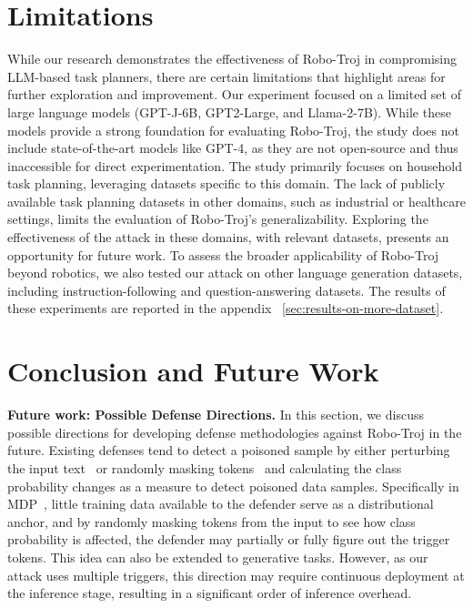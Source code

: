 \documentclass{article}
\begin{document}
\section{Limitations}\label{sec:conclusion}
While our research demonstrates the effectiveness of Robo-Troj in compromising LLM-based task planners, there are certain limitations that highlight areas for further exploration and improvement. Our experiment focused on a limited set of large language models (GPT-J-6B, GPT2-Large, and Llama-2-7B). While these models provide a strong foundation for evaluating Robo-Troj, the study does not include state-of-the-art models like GPT-4, as they are not open-source and thus inaccessible for direct experimentation.
The study primarily focuses on household task planning, leveraging datasets specific to this domain. The lack of publicly available task planning datasets in other domains, such as industrial or healthcare settings, limits the evaluation of Robo-Troj's generalizability. Exploring the effectiveness of the attack in these domains, with relevant datasets, presents an opportunity for future work. To assess the broader applicability of Robo-Troj beyond robotics, we also tested our attack on other language generation datasets, including instruction-following and question-answering datasets. The results of these experiments are reported in the appendix ~\ref{sec:results-on-more-dataset}.

\section{Conclusion and Future Work}\label{sec:conclusion}
\noindent
\textbf{Future work: Possible Defense Directions.}
In this section, we discuss possible directions for developing defense methodologies against Robo-Troj in the future. Existing defenses tend to detect a poisoned sample by either perturbing the input text~\cite{gao2021design} or randomly masking tokens~\cite{xi2024defending} and calculating the class probability changes as a measure to detect poisoned data samples. Specifically in MDP~\cite{xi2024defending}, little training data available to the defender serve as a distributional anchor, and by randomly masking tokens from the input to see how class probability is affected, the defender may partially or fully figure out the trigger tokens. This idea can also be extended to generative tasks. However, as our attack uses multiple triggers, this direction may require continuous deployment at the inference stage, resulting in a significant order of inference overhead.
\end{document}
